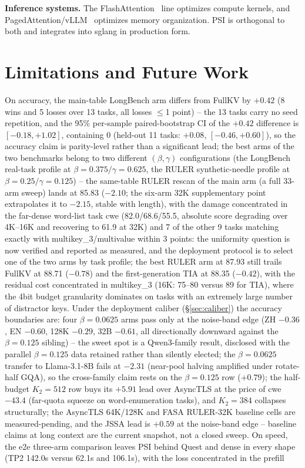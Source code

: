 \documentclass[11pt]{article}
\begin{document}
\textbf{Inference systems.} The FlashAttention~\cite{fa} line optimizes compute kernels, and PagedAttention/vLLM~\cite{vllm} optimizes memory organization. PSI is orthogonal to both and integrates into sglang in production form.

\section{Limitations and Future Work}

On accuracy, the main-table LongBench arm differs from FullKV by $+0.42$ (8 wins and 5 losses over 13 tasks, all losses $\leq$1 point) -- the 13 tasks carry no seed repetition, and the 95\% per-sample paired-bootstrap CI of the $+0.42$ difference is $[-0.18, +1.02]$, containing 0 (held-out 11 tasks: $+0.08$, $[-0.46, +0.60]$), so the accuracy claim is parity-level rather than a significant lead; the best arms of the two benchmarks belong to two different $(\beta,\gamma)$ configurations (the LongBench real-task profile at $\beta{=}0.375/\gamma{=}0.625$, the RULER synthetic-needle profile at $\beta{=}0.25/\gamma{=}0.125$) -- the same-table RULER rescan of the main arm (a full 33-arm sweep) lands at 85.83 ($-2.10$; the six-arm 32K supplementary point extrapolates it to $-2.15$, stable with length), with the damage concentrated in the far-dense word-list task cwe (82.0/68.6/55.5, absolute score degrading over 4K--16K and recovering to 61.9 at 32K) and 7 of the other 9 tasks matching exactly with multikey\_3/multivalue within 3 points: the uniformity question is now verified and reported as measured, and the deployment protocol is to select one of the two arms by task profile; the best RULER arm at 87.93 still trails FullKV at 88.71 ($-0.78$) and the first-generation TIA at 88.35 ($-0.42$), with the residual cost concentrated in multikey\_3 (16K: 75--80 versus 89 for TIA), where the 4bit budget granularity dominates on tasks with an extremely large number of distractor keys. Under the deployment caliber (\S\ref{sec:caliber}) the accuracy boundaries are: four $\beta{=}0.0625$ arms pass only at the noise-band edge (ZH $-0.36$, EN $-0.60$, 128K $-0.29$, 32B $-0.61$, all directionally downward against the $\beta{=}0.125$ sibling) -- the sweet spot is a Qwen3-family result, disclosed with the parallel $\beta{=}0.125$ data retained rather than silently elected; the $\beta{=}0.0625$ transfer to Llama-3.1-8B fails at $-2.31$ (near-pool halving amplified under rotate-half GQA), so the cross-family claim rests on the $\beta{=}0.125$ row ($+0.79$); the half-budget $K_2{=}512$ row buys its $+5.91$ lead over AsyncTLS at the price of cwe $-43.4$ (far-quota squeeze on word-enumeration tasks), and $K_2{=}384$ collapses structurally; the AsyncTLS 64K/128K and FASA RULER-32K baseline cells are measured-pending, and the JSSA lead is $+0.59$ at the noise-band edge -- baseline claims at long context are the current snapshot, not a closed sweep. On speed, the e2e three-arm comparison leaves PSI behind Quest and dense in every shape (TP2 142.0s versus 62.1s and 106.1s), with the loss concentrated in the prefill 
\end{document}
